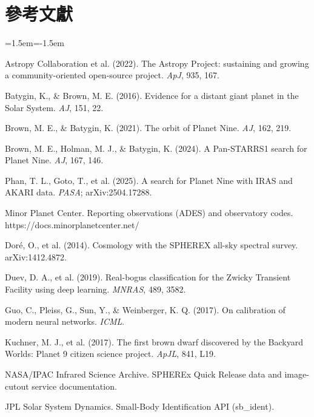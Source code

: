 \documentclass[twocolumn]{aastex631}
\begin{document}
\section*{參考文獻}
\begin{list}{}{\leftmargin=1.5em\itemindent=-1.5em\itemsep=2pt\small}
\item Astropy Collaboration et al. (2022). The Astropy Project: sustaining and growing a community-oriented open-source project. \emph{ApJ}, 935, 167.
\item Batygin, K., \& Brown, M. E. (2016). Evidence for a distant giant planet in the Solar System. \emph{AJ}, 151, 22.
\item Brown, M. E., \& Batygin, K. (2021). The orbit of Planet Nine. \emph{AJ}, 162, 219.
\item Brown, M. E., Holman, M. J., \& Batygin, K. (2024). A Pan-STARRS1 search for Planet Nine. \emph{AJ}, 167, 146.
\item Phan, T. L., Goto, T., et al. (2025). A search for Planet Nine with IRAS and AKARI data. \emph{PASA}; arXiv:2504.17288.
\item Minor Planet Center. Reporting observations (ADES) and observatory codes. https://docs.minorplanetcenter.net/
\item Doré, O., et al. (2014). Cosmology with the SPHEREX all-sky spectral survey. arXiv:1412.4872.
\item Duev, D. A., et al. (2019). Real-bogus classification for the Zwicky Transient Facility using deep learning. \emph{MNRAS}, 489, 3582.
\item Guo, C., Pleiss, G., Sun, Y., \& Weinberger, K. Q. (2017). On calibration of modern neural networks. \emph{ICML}.
\item Kuchner, M. J., et al. (2017). The first brown dwarf discovered by the Backyard Worlds: Planet 9 citizen science project. \emph{ApJL}, 841, L19.
\item NASA/IPAC Infrared Science Archive. SPHEREx Quick Release data and image-cutout service documentation.
\item JPL Solar System Dynamics. Small-Body Identification API (sb\_ident).
\end{list}
\end{document}
